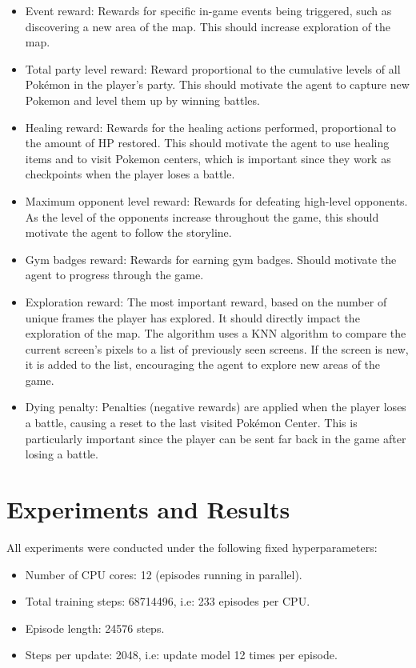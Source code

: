 \documentclass[10pt,conference]{IEEEtran}
\begin{document}
\begin{itemize}
  \item Event reward: Rewards for specific in-game events being triggered, such as discovering a new area of the map. This should increase exploration of the map.
  \item Total party level reward: Reward proportional to the cumulative levels of all Pokémon in the player's party. This should motivate the agent to capture new Pokemon and level them up by winning battles.
  \item Healing reward: Rewards for the healing actions performed, proportional to the amount of HP restored. This should motivate the agent to use healing items and to visit Pokemon centers, which is important since they work as checkpoints when the player loses a battle.
  \item Maximum opponent level reward: Rewards for defeating high-level opponents. As the level of the opponents increase throughout the game, this should motivate the agent to follow the storyline.
  \item Gym badges reward: Rewards for earning gym badges. Should motivate the agent to progress through the game.
  \item Exploration reward: The most important reward, based on the number of unique frames the player has explored. It should directly impact the exploration of the map. The algorithm uses a KNN algorithm to compare the current screen's pixels to a list of previously seen screens. If the screen is new, it is added to the list, encouraging the agent to explore new areas of the game.
  \item Dying penalty: Penalties (negative rewards) are applied when the player loses a battle, causing a reset to the last visited Pokémon Center. This is particularly important since the player can be sent far back in the game after losing a battle.
\end{itemize}



\newpage



\section{Experiments and Results}

All experiments were conducted under the following fixed hyperparameters:

\begin{itemize}
  \item Number of CPU cores: 12 (episodes running in parallel).
  \item Total training steps: 68714496, i.e: 233 episodes per CPU.
  \item Episode length: 24576 steps.
  \item Steps per update: 2048, i.e: update model 12 times per episode.
\end{itemize}
\end{document}

